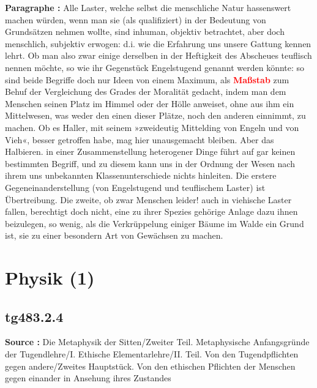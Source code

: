 \documentclass[a4paper,12pt,twoside]{book}
\newcommand{\match}[1]{\textcolor{red}{\textbf{#1}}}
\newcommand{\unnumberedsection}[1]{
	\section*{#1}
	\addcontentsline{toc}{section}{#1}
	\markright{#1}
}
\begin{document}
	\textbf{Paragraphe : }Alle Laster, welche selbst die menschliche Natur hassenswert machen würden, wenn man sie (als qualifiziert) in der Bedeutung von Grundsätzen nehmen wollte, sind inhuman, objektiv betrachtet, aber doch menschlich, subjektiv erwogen: d.i. wie die Erfahrung uns unsere Gattung kennen lehrt. Ob man also zwar einige derselben in der Heftigkeit des Abscheues teuflisch nennen möchte, so wie ihr Gegenstück Engelstugend genannt werden könnte: so sind beide Begriffe doch nur Ideen von einem Maximum, als \match{Maßstab} zum Behuf der Vergleichung des Grades der Moralität gedacht, indem man dem Menschen seinen Platz im Himmel oder der Hölle anweiset, ohne aus ihm ein Mittelwesen, was weder den einen dieser Plätze, noch den anderen einnimmt, zu machen. Ob es Haller, mit seinem »zweideutig Mittelding von Engeln und von Vieh«, besser getroffen habe, mag hier unausgemacht bleiben. Aber das Halbieren. in einer Zusammenstellung heterogener Dinge führt auf gar keinen bestimmten Begriff, und zu diesem kann uns in der Ordnung der Wesen nach ihrem uns unbekannten Klassenunterschiede nichts hinleiten. Die erstere Gegeneinanderstellung (von Engelstugend und teuflischem  Laster) ist Übertreibung. Die zweite, ob zwar Menschen leider! auch in viehische Laster fallen, berechtigt doch nicht, eine zu ihrer Spezies gehörige Anlage dazu ihnen beizulegen, so wenig, als die Verkrüppelung einiger Bäume im Walde ein Grund ist, sie zu einer besondern Art von Gewächsen zu machen. 
	
	\unnumberedsection{Physik (1)} 
	\subsection*{tg483.2.4} 
	\textbf{Source : }Die Metaphysik der Sitten/Zweiter Teil. Metaphysische Anfangsgründe der Tugendlehre/I. Ethische Elementarlehre/II. Teil. Von den Tugendpflichten gegen andere/Zweites Hauptstück. Von den ethischen Pflichten der Menschen gegen einander in Ansehung ihres Zustandes\\  
	
\end{document}
